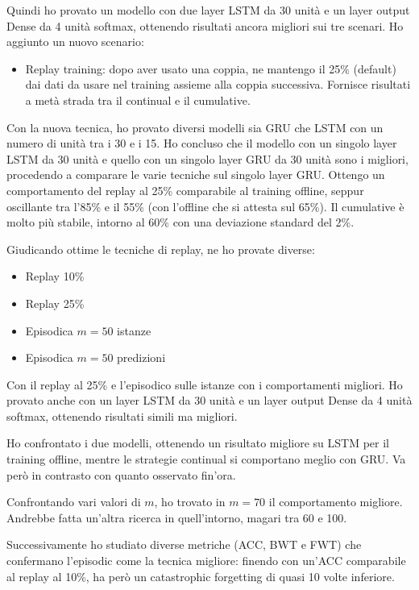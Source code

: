 \documentclass[11pt, a4paper, twoside, openright]{book}
\begin{document}
Quindi ho provato un modello con due layer LSTM da 30 unità e un layer output Dense da 4 unità softmax, ottenendo risultati ancora migliori sui tre scenari. Ho aggiunto un nuovo scenario:
\begin{itemize}
    \item Replay training: dopo aver usato una coppia, ne mantengo il 25\% (default) dai dati da usare nel training assieme alla coppia successiva. Fornisce risultati a metà strada tra il continual e il cumulative.
\end{itemize}

Con la nuova tecnica, ho provato diversi modelli sia GRU che LSTM con un numero di unità tra i 30 e i 15. Ho concluso che il modello con un singolo layer LSTM da 30 unità e quello con un singolo layer GRU da 30 unità sono i migliori, procedendo a comparare le varie tecniche sul singolo layer GRU. Ottengo un comportamento del replay al 25\% comparabile al training offline, seppur oscillante tra l'85\% e il 55\% (con l'offline che si attesta sul 65\%). Il cumulative è molto più stabile, intorno al 60\% con una deviazione standard del 2\%.

Giudicando ottime le tecniche di replay, ne ho provate diverse:
\begin{itemize}
    \item Replay 10\%
    \item Replay 25\%
    \item Episodica  $m=50$  istanze
    \item Episodica  $m=50$  predizioni
\end{itemize}

Con il replay al 25\% e l'episodico sulle istanze con i comportamenti migliori. Ho provato anche con un layer LSTM da 30 unità e un layer output Dense da 4 unità softmax, ottenendo risultati simili ma migliori.

Ho confrontato i due modelli, ottenendo un risultato migliore su LSTM per il training offline, mentre le strategie continual si comportano meglio con GRU. Va però in contrasto con quanto osservato fin'ora.

Confrontando vari valori di  $m$, ho trovato in  $m=70$  il comportamento migliore. Andrebbe fatta un'altra ricerca in quell'intorno, magari tra 60 e 100.

Successivamente ho studiato diverse metriche (ACC, BWT e FWT) che confermano l'episodic come la tecnica migliore: finendo con un'ACC comparabile al replay al 10\%, ha però un catastrophic forgetting di quasi 10 volte inferiore.
\end{document}
